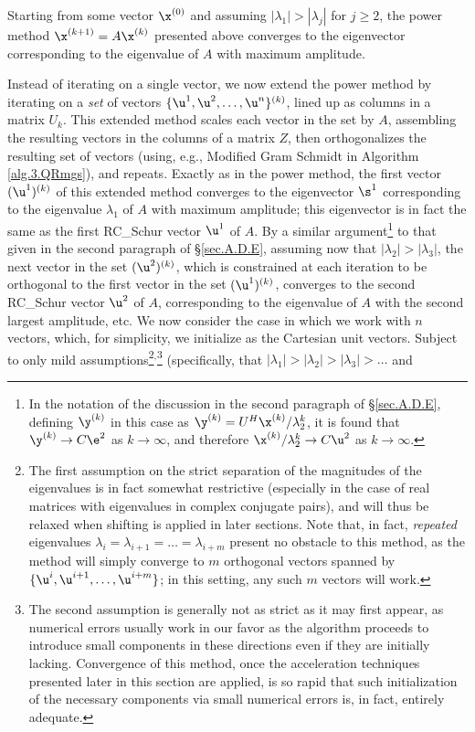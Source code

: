 
\noindent Starting from some vector $\x^{(0)}$ and assuming $|\lambda_1|>|\lambda_j|$ for $j\ge 2$,
the power method $\x^{(k+1)}=A\x^{(k)}$ presented above converges to the eigenvector corresponding
to the eigenvalue of $A$ with maximum amplitude. 

Instead of iterating on a single vector, we now extend the power method by iterating on a {\it set} of vectors $\{\u^{1},\u^{2},\ldots,\u^{n}\}^{(k)}$,
lined up as columns in a matrix ${U_k}$.  This extended method scales each vector in the set by $A$, assembling the resulting vectors in the columns of
a matrix $Z$, then orthogonalizes the resulting set of vectors (using, e.g., Modified Gram Schmidt in Algorithm \ref{alg.3.QRmgs}), and repeats.  
Exactly as in the power method, the first vector $(\u^{1})^{(k)}$ of this extended method converges to the eigenvector $\s^1$
corresponding to the eigenvalue $\lambda_1$ of $A$ with
maximum amplitude; this eigenvector is in fact the same as the first RC_Schur vector $\u^1$ of $A$.  By a similar argument\footnote{In the notation
of the discussion in the second paragraph of \S \ref{sec.A.D.E}, defining $\y^{(k)}$ in this case as $\y^{(k)}=U^H\x^{(k)}/\lambda^k_2$,
it is found that $\y^{(k)}\rightarrow C\e^2$ as $k\rightarrow\infty$, and therefore $\x^{(k)}/\lambda_2^k\rightarrow C\u^2$  as
$k\rightarrow\infty$.} to that given in the second paragraph of \S \ref{sec.A.D.E}, assuming now that $|\lambda_2|>|\lambda_3|$,
the next vector in the set $(\u^{2})^{(k)}$, which is constrained at each iteration to be orthogonal to the first vector in the set $(\u^{1})^{(k)}$,
converges to the second RC_Schur vector $\u^2$ of $A$, corresponding to the eigenvalue of $A$ with the second largest amplitude, etc.
We now consider the case in which we work with $n$ vectors, which, for simplicity, we initialize as the Cartesian unit vectors.  
Subject to only mild assumptions\footnote{The first assumption on the strict separation of the magnitudes of the eigenvalues
is in fact somewhat restrictive (especially in the case of real matrices with eigenvalues in complex conjugate pairs),
and will thus be relaxed when shifting is applied in later sections.  Note that, in fact, {\it repeated} eigenvalues
$\lambda_i=\lambda_{i+1}=\ldots=\lambda_{i+m}$
present no obstacle to this method, as the method will simply converge to $m$ orthogonal vectors spanned by $\{\u^i,\u^{i+1},\ldots,\u^{i+m}\}$;
in this setting, any such $m$ vectors will work.}$^{,}$\footnote{The \label{footnoteC} second assumption is generally not as strict as it may first appear, as numerical errors
usually work in our favor as the algorithm proceeds to introduce
small components in these directions even if they are initially lacking.  Convergence of this method, once the acceleration techniques
presented later in this section are applied, is so rapid that such initialization of the necessary components
via small numerical errors is, in fact, entirely adequate.} (specifically, that $|\lambda_1|>|\lambda_2|>|\lambda_3|>\ldots$ and
